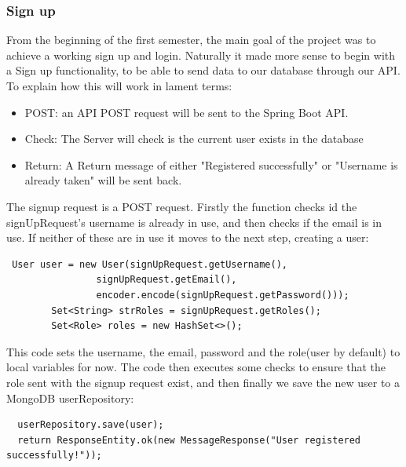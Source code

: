 \subsubsection{Sign up}
From the beginning of the first semester, the main goal of the project was to achieve a working sign up and login. Naturally it made more sense to begin with a Sign up functionality, to be able to send data to our database through our API. To explain how this will work in lament terms:
\begin{itemize}
    \item POST: an API POST request will be sent to the Spring Boot API.
    \item Check: The Server will check is the current user exists in the database
    \item Return: A Return message of either "Registered successfully" or "Username is already taken" will be sent back.
\end{itemize}
\par The signup request is a POST request. Firstly the function checks id the signUpRequest's username is already in use, and then checks if the email is in use. If neither of these are in use it moves to the next step, creating a user: \par
\begin{verbatim}
 User user = new User(signUpRequest.getUsername(),
                signUpRequest.getEmail(),
                encoder.encode(signUpRequest.getPassword()));
        Set<String> strRoles = signUpRequest.getRoles();
        Set<Role> roles = new HashSet<>();
\end{verbatim}
\par This code sets the username, the email, password and the role(user by default) to local variables for now. The code then executes some checks to ensure that the role sent with the signup request exist, and then finally we save the new user to a MongoDB userRepository: \par
\begin{verbatim}
  userRepository.save(user);
  return ResponseEntity.ok(new MessageResponse("User registered successfully!"));
\end{verbatim}

